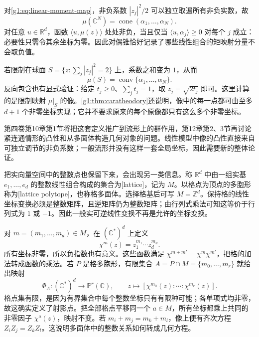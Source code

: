 \begin{example}\label{g1:exm:moment-cone-polytope}
	对\eqref{g1:eq:linear-moment-map}，非负系数 \(|z_j|^2/2\) 可以独立取遍所有非负实数，故
	\[
		\mu(\mathbb C^N)=\operatorname{cone}(\alpha_1,\ldots,\alpha_N).
	\]
	对任意 \(u\in\mathbb R^d\)，函数 \(\langle u,\mu(z)\rangle\) 处处非负，当且仅当 \(\langle u,\alpha_j\rangle\ge0\) 对每个 \(j\) 成立：必要性只需令其余坐标为零。因此对偶锥恰好记录了哪些线性组合的矩映射分量不会取负值。

	若限制在球面 \(S=\{z:\sum_j|z_j|^2=2\}\) 上，系数之和变为 \(1\)，从而
	\[
		\mu(S)=\operatorname{conv}\{\alpha_1,\ldots,\alpha_N\}.
	\]
	反向包含也有显式验证：给定 \(t_j\ge0\)、\(\sum_jt_j=1\)，取 \(z_j=\sqrt{2t_j}\) 即可。这里计算的是限制映射 \(\mu|_S\) 的像。\cref{g1:thm:caratheodory}还说明，像中的每一点都可由至多 \(d+1\) 个非零坐标实现；它并不要求原来的每个原像都只有这么多个非零坐标。
\end{example}

第四卷第10章第1节将把这套定义推广到流形上的群作用，第12章第2、3节再讨论紧连通情形的凸性和从多面体构造几何对象的问题。线性模型中像的凸性直接来自可独立调节的非负系数；一般流形并没有这样一套全局坐标，因此需要新的整体论证。

\ProseParagraphBreak

把实向量空间中的整数点也保留下来，会出现另一类信息。称 \(\mathbb R^d\) 中由一组实基 \(e_1,\ldots,e_d\) 的整数线性组合构成的集合为[lattice]，记为 \(M\)。以格点为顶点的多胞形称为[lattice polytope]，也称格多面体。选择格基后可写 \(M=\mathbb Z^d\)。保持格的线性坐标变换必须是整数矩阵，且逆矩阵仍为整数矩阵；由行列式乘法可知这等价于行列式为 \(1\) 或 \(-1\)。因此一般实可逆线性变换不再是允许的坐标变换。

对 \(m=(m_1,\ldots,m_d)\in M\)，在 \((\mathbb C^*)^d\) 上定义
\[
	\chi^m(z)=z_1^{m_1}\cdots z_d^{m_d}.
\]
所有坐标非零，所以负指数也有意义。这些函数满足 \(\chi^{m+m'}=\chi^m\chi^{m'}\)，把格的加法转成函数的乘法。若 \(P\) 是格多胞形，有限集合 \(A=P\cap M=\{m_0,\ldots,m_r\}\) 就给出映射
\begin{equation}\label{g1:eq:lattice-monomial-map}
	\Phi_A:(\mathbb C^*)^d\longrightarrow\mathbb P^r(\mathbb C),\qquad
	z\longmapsto[\chi^{m_0}(z):\cdots:\chi^{m_r}(z)].
\end{equation}
格点集有限，是因为有界集合中每个整数坐标只有有限种可能；各单项式均非零，故这确实定义了射影点。把全部格点平移同一个 \(a\in M\)，所有坐标都乘上共同的非零因子 \(\chi^a(z)\)，映射不变。若 \(m_i+m_j=m_k+m_l\)，像上便有齐次方程 \(Z_iZ_j=Z_kZ_l\)。这说明多面体中的整数关系如何转成几何方程。


